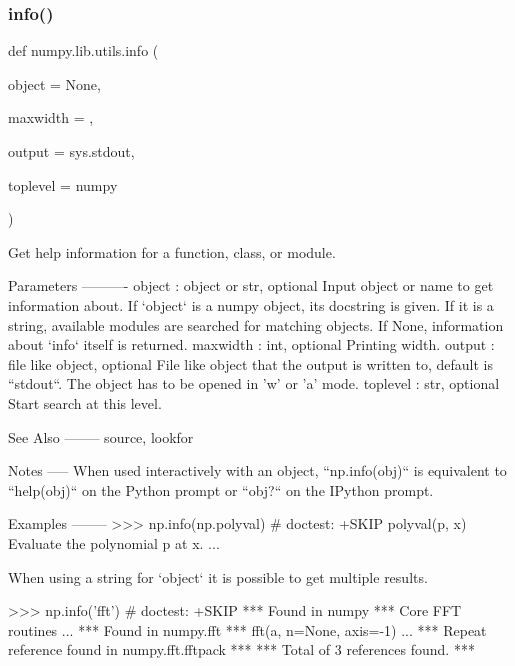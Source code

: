 \subsubsection{\texorpdfstring{info()}{info()}}
{\footnotesize\ttfamily def numpy.\+lib.\+utils.\+info (\begin{DoxyParamCaption}\item[{}]{object = {\ttfamily None},  }\item[{}]{maxwidth = {},  }\item[{}]{output = {\ttfamily sys.stdout},  }\item[{}]{toplevel = {\ttfamily \textquotesingle{}numpy\textquotesingle{}} }\end{DoxyParamCaption})}

\begin{DoxyVerb}Get help information for a function, class, or module.

Parameters
----------
object : object or str, optional
    Input object or name to get information about. If `object` is a
    numpy object, its docstring is given. If it is a string, available
    modules are searched for matching objects.  If None, information
    about `info` itself is returned.
maxwidth : int, optional
    Printing width.
output : file like object, optional
    File like object that the output is written to, default is
    ``stdout``.  The object has to be opened in 'w' or 'a' mode.
toplevel : str, optional
    Start search at this level.

See Also
--------
source, lookfor

Notes
-----
When used interactively with an object, ``np.info(obj)`` is equivalent
to ``help(obj)`` on the Python prompt or ``obj?`` on the IPython
prompt.

Examples
--------
>>> np.info(np.polyval) # doctest: +SKIP
   polyval(p, x)
     Evaluate the polynomial p at x.
     ...

When using a string for `object` it is possible to get multiple results.

>>> np.info('fft') # doctest: +SKIP
     *** Found in numpy ***
Core FFT routines
...
     *** Found in numpy.fft ***
 fft(a, n=None, axis=-1)
...
     *** Repeat reference found in numpy.fft.fftpack ***
     *** Total of 3 references found. ***\end{DoxyVerb}
 \mbox{\label{namespacenumpy_1_1lib_1_1utils_ad34dd70d113be622ed9a750e9c99de9a}} 
